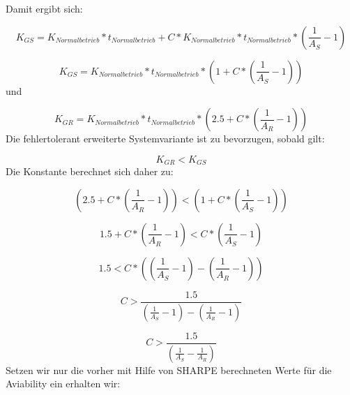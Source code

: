 \documentclass[a4paper]{article}
\begin{document}
\bigskip

Damit ergibt sich:


\bigskip

\begin{equation*}
K_{\mathit{GS}}=K_{\mathit{Normalbetrieb}}\ast
t_{\mathit{Normalbetrieb}}+C\ast K_{\mathit{Normalbetrieb}}\ast
t_{\mathit{Normalbetrieb}}\ast (\frac{1}{A_{S}}-1)
\end{equation*}

\bigskip

\begin{equation*}
K_{\mathit{GS}}=K_{\mathit{Normalbetrieb}}\ast
t_{\mathit{Normalbetrieb}}\ast (1+C\ast (\frac{1}{A_{S}}-1))
\end{equation*}
und


\bigskip

\begin{equation*}
K_{\mathit{GR}}=K_{\mathit{Normalbetrieb}}\ast
t_{\mathit{Normalbetrieb}}\ast (2.5+C\ast (\frac{1}{A_{R}}-1))
\end{equation*}
Die fehlertolerant erweiterte Systemvariante ist zu bevorzugen, sobald gilt:


\bigskip

\begin{equation*}
K_{\mathit{GR}}<K_{\mathit{GS}}
\end{equation*}
Die Konstante berechnet sich daher zu:


\bigskip

\begin{equation*}
(2.5+C\ast (\frac{1}{A_{R}}-1))<(1+C\ast (\frac{1}{A_{S}}-1))
\end{equation*}

\bigskip

\begin{equation*}
1.5+C\ast (\frac{1}{A_{R}}-1)<C\ast (\frac{1}{A_{S}}-1)
\end{equation*}

\bigskip

\begin{equation*}
1.5<C\ast ((\frac{1}{A_{S}}-1)-(\frac{1}{A_{R}}-1))
\end{equation*}

\bigskip

\begin{equation*}
C>\frac{1.5}{(\frac{1}{A_{S}}-1)-(\frac{1}{A_{R}}-1)}
\end{equation*}

\bigskip

\begin{equation*}
C>\frac{1.5}{(\frac{1}{A_{S}}-\frac{1}{A_{R}})}
\end{equation*}
Setzen wir nur die vorher mit Hilfe von SHARPE berechneten Werte f\"ur die Aviability ein erhalten wir:
\end{document}
